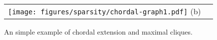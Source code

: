 
\begin{figure}[htbp]
    \centering
    \begin{minipage}{\columnwidth}
        \centering
        \begin{tabular}{cc}
            \begin{minipage}{0.5\columnwidth}
                \centering
                \texttt{[image: figures/sparsity/chordal-graph1.pdf]}
                (b)
            \end{minipage}
        \end{tabular}
    \end{minipage}

    \caption{An simple example of chordal extension and maximal cliques.
    \label{fig:sp:chordal-extension}}
\end{figure}